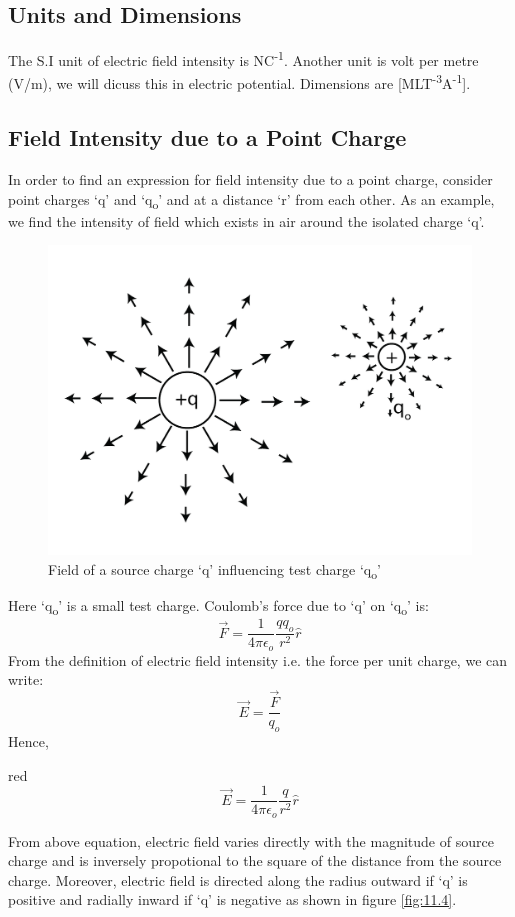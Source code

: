 \subsection*{Units and Dimensions}
The S.I unit of electric field intensity is NC\textsuperscript{-1}. Another unit is volt per metre (V/m),
we will dicuss this in electric potential. Dimensions are [MLT\textsuperscript{-3}A\textsuperscript{-1}].
\subsection{Field Intensity due to a Point Charge}
In order to find an expression for field intensity due to a point charge,
consider point charges `q' and `q\textsubscript{o}' and at a distance `r' from each other.
As an example, we find the intensity of field
which exists in air around the isolated charge ‘q’.
\begin{figure}[H]
  \centering
  \includegraphics[scale = 0.9]{Images/11.3.png}
  \caption{Field of a source charge  `q' influencing test charge `q\textsubscript{o}'}
  \label{fig:11.3}
\end{figure}
Here `q\textsubscript{o}' is a small test charge. Coulomb’s force due
to ‘q’ on `q\textsubscript{o}' is:
\begin{equation}\label{eq:11.14}
  \vec{F} = \frac{1}{4\pi\epsilon_{o}} \frac{qq_{o}}{r^{2}} \hat{r}
\end{equation}
From the definition of electric field intensity i.e. the force per unit charge,
we can write:
\begin{equation}
  \vec{E} = \frac{\vec{F}}{q_{o}} \nonumber
\end{equation}
Hence,
\begin{mybox}{red}{}
\begin{equation}\label{eq:11.15}
  \vec{E} = \frac{1}{4\pi\epsilon_{o}} \frac{q}{r^{2}} \hat{r}
\end{equation}
\end{mybox}
From above equation, electric field varies directly with the magnitude
of source charge and is inversely propotional to the square of the
distance from the source charge. Moreover, electric field is
directed along the radius outward if ‘q’ is 
positive and radially inward if ‘q’ is negative as shown in figure \ref{fig:11.4}.

